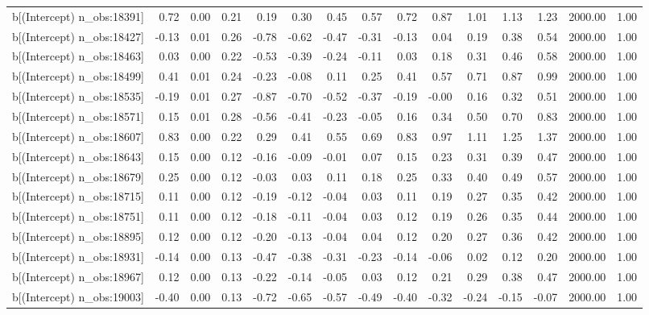\begin{table}[ht]
\begin{tabular}{rrrrrrrrrrrrrrr}
  b[(Intercept) n\_obs:18391] & 0.72 & 0.00 & 0.21 & 0.19 & 0.30 & 0.45 & 0.57 & 0.72 & 0.87 & 1.01 & 1.13 & 1.23 & 2000.00 & 1.00 \\ 
  b[(Intercept) n\_obs:18427] & -0.13 & 0.01 & 0.26 & -0.78 & -0.62 & -0.47 & -0.31 & -0.13 & 0.04 & 0.19 & 0.38 & 0.54 & 2000.00 & 1.00 \\ 
  b[(Intercept) n\_obs:18463] & 0.03 & 0.00 & 0.22 & -0.53 & -0.39 & -0.24 & -0.11 & 0.03 & 0.18 & 0.31 & 0.46 & 0.58 & 2000.00 & 1.00 \\ 
  b[(Intercept) n\_obs:18499] & 0.41 & 0.01 & 0.24 & -0.23 & -0.08 & 0.11 & 0.25 & 0.41 & 0.57 & 0.71 & 0.87 & 0.99 & 2000.00 & 1.00 \\ 
  b[(Intercept) n\_obs:18535] & -0.19 & 0.01 & 0.27 & -0.87 & -0.70 & -0.52 & -0.37 & -0.19 & -0.00 & 0.16 & 0.32 & 0.51 & 2000.00 & 1.00 \\ 
  b[(Intercept) n\_obs:18571] & 0.15 & 0.01 & 0.28 & -0.56 & -0.41 & -0.23 & -0.05 & 0.16 & 0.34 & 0.50 & 0.70 & 0.83 & 2000.00 & 1.00 \\ 
  b[(Intercept) n\_obs:18607] & 0.83 & 0.00 & 0.22 & 0.29 & 0.41 & 0.55 & 0.69 & 0.83 & 0.97 & 1.11 & 1.25 & 1.37 & 2000.00 & 1.00 \\ 
  b[(Intercept) n\_obs:18643] & 0.15 & 0.00 & 0.12 & -0.16 & -0.09 & -0.01 & 0.07 & 0.15 & 0.23 & 0.31 & 0.39 & 0.47 & 2000.00 & 1.00 \\ 
  b[(Intercept) n\_obs:18679] & 0.25 & 0.00 & 0.12 & -0.03 & 0.03 & 0.11 & 0.18 & 0.25 & 0.33 & 0.40 & 0.49 & 0.57 & 2000.00 & 1.00 \\ 
  b[(Intercept) n\_obs:18715] & 0.11 & 0.00 & 0.12 & -0.19 & -0.12 & -0.04 & 0.03 & 0.11 & 0.19 & 0.27 & 0.35 & 0.42 & 2000.00 & 1.00 \\ 
  b[(Intercept) n\_obs:18751] & 0.11 & 0.00 & 0.12 & -0.18 & -0.11 & -0.04 & 0.03 & 0.12 & 0.19 & 0.26 & 0.35 & 0.44 & 2000.00 & 1.00 \\ 
  b[(Intercept) n\_obs:18895] & 0.12 & 0.00 & 0.12 & -0.20 & -0.13 & -0.04 & 0.04 & 0.12 & 0.20 & 0.27 & 0.36 & 0.42 & 2000.00 & 1.00 \\ 
  b[(Intercept) n\_obs:18931] & -0.14 & 0.00 & 0.13 & -0.47 & -0.38 & -0.31 & -0.23 & -0.14 & -0.06 & 0.02 & 0.12 & 0.20 & 2000.00 & 1.00 \\ 
  b[(Intercept) n\_obs:18967] & 0.12 & 0.00 & 0.13 & -0.22 & -0.14 & -0.05 & 0.03 & 0.12 & 0.21 & 0.29 & 0.38 & 0.47 & 2000.00 & 1.00 \\ 
  b[(Intercept) n\_obs:19003] & -0.40 & 0.00 & 0.13 & -0.72 & -0.65 & -0.57 & -0.49 & -0.40 & -0.32 & -0.24 & -0.15 & -0.07 & 2000.00 & 1.00 \\ 

\end{tabular}
\end{table}
